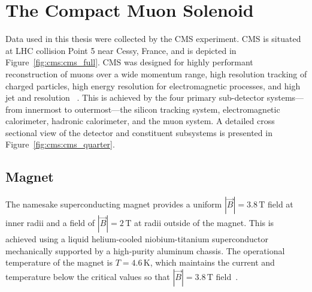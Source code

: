 \section{The Compact Muon Solenoid}\label{ch:cms:CMS}

Data used in this thesis were collected by the CMS experiment. CMS is situated at LHC collision Point 5 near Cessy, France, and is depicted in Figure~\ref{fig:cms:cms_full}. CMS was designed for highly performant reconstruction of muons over a wide momentum range, high resolution tracking of charged particles, high energy resolution for electromagnetic processes, and high jet and \met resolution ~\cite{Ball:2007zza,Bayatian:2006nff}. This is achieved by the four primary sub-detector systems---from innermost to outermost---the silicon tracking system, electromagnetic calorimeter, hadronic calorimeter, and the muon system. A detailed cross sectional view of the detector and constituent subsystems is presented in Figure~\ref{fig:cms:cms_quarter}.






\subsection{Magnet}\label{ch:cms:magnet}
The namesake superconducting magnet provides a uniform $|\vec{B}| = 3.8 \,\mathrm{T}$ field at inner radii and a field of $|\vec{B}| = 2 \,\mathrm{T}$ at radii outside of the magnet. This is achieved using a liquid helium-cooled niobium-titanium superconductor mechanically supported by a high-purity aluminum chassis. The operational temperature of the magnet is $T = 4.6 \,\mathrm{K}$, which maintains the current and temperature below the critical values so that $|\vec{B}| = 3.8 \,\mathrm{T}$ field~\cite{Acquistapace:1997fm}.

